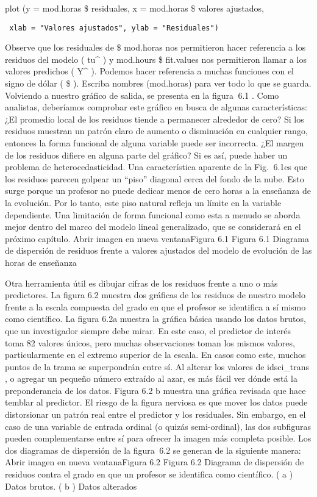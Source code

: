 \documentclass[
]{book}
\begin{document}
plot (y = mod.horas \$ residuales, x = mod.horas \$ valores ajustados,

\begin{verbatim}
 xlab = "Valores ajustados", ylab = "Residuales")
\end{verbatim}

Observe que los residuales de \$ mod.horas nos permitieron hacer referencia a los residuos del modelo ( tu\^{} ) y mod.hours \$ fit.values nos permitieron llamar a los valores predichos ( Y\^{} ). Podemos hacer referencia a muchas funciones con el signo de dólar ( \$ ). Escriba nombres (mod.horas) para ver todo lo que se guarda. Volviendo a nuestro gráfico de salida, se presenta en la figura  6.1 . Como analistas, deberíamos comprobar este gráfico en busca de algunas características: ¿El promedio local de los residuos tiende a permanecer alrededor de cero? Si los residuos muestran un patrón claro de aumento o disminución en cualquier rango, entonces la forma funcional de alguna variable puede ser incorrecta. ¿El margen de los residuos difiere en alguna parte del gráfico? Si es así, puede haber un problema de heterocedasticidad. Una característica aparente de la Fig.  6.1es que los residuos parecen golpear un ``piso'' diagonal cerca del fondo de la nube. Esto surge porque un profesor no puede dedicar menos de cero horas a la enseñanza de la evolución. Por lo tanto, este piso natural refleja un límite en la variable dependiente. Una limitación de forma funcional como esta a menudo se aborda mejor dentro del marco del modelo lineal generalizado, que se considerará en el próximo capítulo.
Abrir imagen en nueva ventanaFigura 6.1
Figura 6.1
Diagrama de dispersión de residuos frente a valores ajustados del modelo de evolución de las horas de enseñanza

Otra herramienta útil es dibujar cifras de los residuos frente a uno o más predictores. La figura 6.2 muestra dos gráficas de los residuos de nuestro modelo frente a la escala compuesta del grado en que el profesor se identifica a sí mismo como científico. La figura 6.2a muestra la gráfica básica usando los datos brutos, que un investigador siempre debe mirar. En este caso, el predictor de interés toma 82 valores únicos, pero muchas observaciones toman los mismos valores, particularmente en el extremo superior de la escala. En casos como este, muchos puntos de la trama se superpondrán entre sí. Al alterar los valores de idsci\_trans , o agregar un pequeño número extraído al azar, es más fácil ver dónde está la preponderancia de los datos. Figura 6.2 b muestra una gráfica revisada que hace temblar al predictor. El riesgo de la figura nerviosa es que mover los datos puede distorsionar un patrón real entre el predictor y los residuales. Sin embargo, en el caso de una variable de entrada ordinal (o quizás semi-ordinal), las dos subfiguras pueden complementarse entre sí para ofrecer la imagen más completa posible. Los dos diagramas de dispersión de la figura  6.2 se generan de la siguiente manera:
Abrir imagen en nueva ventanaFigura 6.2
Figura 6.2
Diagrama de dispersión de residuos contra el grado en que un profesor se identifica como científico. ( a ) Datos brutos. ( b ) Datos alterados
\end{document}
